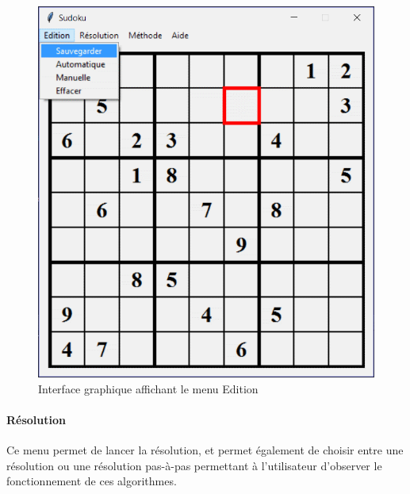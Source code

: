 \documentclass[12pt,a4paper]{report}
\begin{document}
\begin{figure}[!h]
 \center
 \includegraphics[scale=0.5]{../pictures/Sudoku_edition}
 \caption{Interface graphique affichant le menu Edition}
\end{figure}

\paragraph{Résolution}Ce menu permet de lancer la résolution, et permet également de choisir entre une résolution ou une résolution pas-à-pas permettant à l'utilisateur d'observer le fonctionnement de ces algorithmes.
\end{document}
